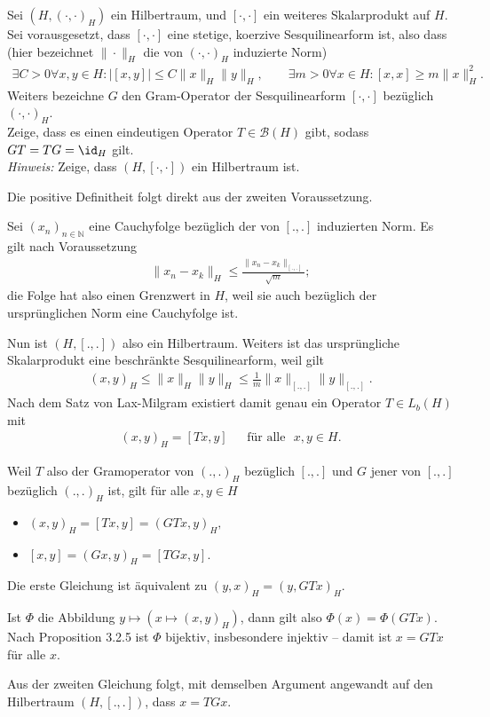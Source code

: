 \begin{exercise}
Sei $(H,(\cdot,\cdot)_H)$ ein Hilbertraum, und $[\cdot,\cdot]$ ein weiteres Skalarprodukt
auf $H$. Sei vorausgesetzt, dass $[\cdot,\cdot]$ eine stetige, koerzive Sesquilinearform
ist, also dass (hier bezeichnet $\|\cdot\|_H$ die von $(\cdot,\cdot)_H$ induzierte Norm)
\begin{align*}
  \exists C > 0 \forall x,y \in H: |[x,y]| \leq C\|x\|_H\|y\|_H, \qquad
  \exists m > 0 \forall x \in H: [x,x] \geq m\|x\|_H^2.
\end{align*}
Weiters bezeichne $G$ den Gram-Operator der Sesquilinearform $[\cdot,\cdot]$
bezüglich $(\cdot,\cdot)_H$. \\
Zeige, dass es einen eindeutigen Operator $T \in \mathcal{B}(H)$ gibt, sodass
$GT = TG = \id_H $ gilt. \\
\textit{Hinweis:} Zeige, dass $(H,[\cdot,\cdot])$ ein Hilbertraum ist.
\end{exercise}
\begin{solution}
  Die positive Definitheit folgt direkt aus der zweiten Voraussetzung.

  Sei $(x_n)_{n \in \mathbb{N}}$ eine Cauchyfolge bezüglich der von $[.,.]$ induzierten Norm. Es gilt nach Voraussetzung
  \begin{align}
      \|x_n - x_k\|_H \leq \frac{\|x_n - x_k\|_{[.,.]}}{\sqrt{m}};
  \end{align}
  die Folge hat also einen Grenzwert in $H$, weil sie auch bezüglich der ursprünglichen Norm eine Cauchyfolge ist.

  Nun ist $(H, [.,.])$ also ein Hilbertraum. Weiters ist das ursprüngliche Skalarprodukt eine beschränkte Sesquilinearform,
  weil gilt
\begin{align}
    (x, y)_H \leq \|x\|_H \|y\|_H \leq \frac{1}{m} \|x\|_{[.,.]} \|y\|_{[.,.]}.
\end{align}
Nach dem Satz von Lax-Milgram existiert damit genau ein Operator $T \in L_b(H)$ mit
  \begin{align}
      (x, y)_H = [Tx, y] ~~~~~~~ \text{für alle~~} x, y \in H.
  \end{align}

  Weil $T$ also der Gramoperator von $(.,.)_H$ bezüglich $[.,.]$ und $G$ jener von $[.,.]$ bezüglich $(.,.)_H$ ist, gilt für alle $x, y \in H$

  \begin{itemize}
      \item $(x, y)_H = [Tx, y] = (GTx, y)_H,$
      \item $[x, y] = (Gx, y)_H = [TGx, y].$
  \end{itemize}

  Die erste Gleichung ist äquivalent zu $(y, x)_H = (y, GTx)_H.$

  Ist $\Phi$ die Abbildung $y \mapsto (x \mapsto (x, y)_H)$, dann gilt also $\Phi(x) = \Phi(GTx)$. Nach Proposition 3.2.5 ist $\Phi$ bijektiv, insbesondere injektiv -- damit ist $x = GTx$ für alle $x$.

  Aus der zweiten Gleichung folgt, mit demselben Argument angewandt auf den Hilbertraum $(H, [.,.])$, dass $x = TGx.$
\end{solution}
